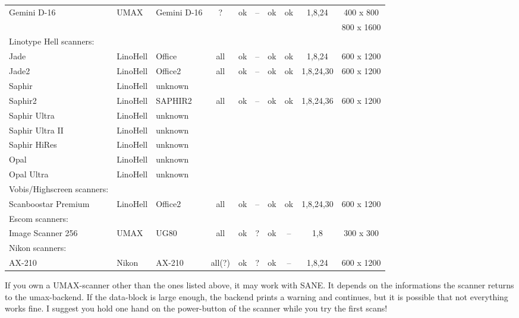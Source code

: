 \begin{tabular}{|l|l|l|c|c|c|c|c|c|c|}
Gemini D-16        &UMAX     &Gemini D-16     &?       &ok  &--  &ok  &ok    &1,8,24    &  400 x 800\\
                   &         &                &        &    &    &    &      &          &  800 x 1600\\
\hline
Linotype Hell scanners:&&&&&&&&&\\
Jade               &LinoHell &Office          &all     &ok  &--  &ok  &ok    &1,8,24    &  600 x 1200\\
Jade2              &LinoHell &Office2         &all     &ok  &--  &ok  &ok    &1,8,24,30 &  600 x 1200\\
Saphir             &LinoHell &unknown         &        &    &    &    &      &          &\\
Saphir2            &LinoHell &SAPHIR2         &all     &ok  &--  &ok  &ok    &1,8,24,36 &  600 x 1200\\
Saphir Ultra       &LinoHell &unknown         &        &    &    &    &      &          &\\
Saphir Ultra II    &LinoHell &unknown         &        &    &    &    &      &          &\\
Saphir HiRes       &LinoHell &unknown         &        &    &    &    &      &          &\\
Opal               &LinoHell &unknown         &        &    &    &    &      &          &\\
Opal Ultra         &LinoHell &unknown         &        &    &    &    &      &          &\\
\hline
Vobis/Highscreen scanners:&&&&&&&&&\\
Scanboostar Premium &LinoHell &Office2         &all     &ok  &--  &ok  &ok    &1,8,24,30 &  600 x 1200\\
\hline
Escom scanners:&&&&&&&&&\\
Image Scanner 256  &UMAX     &UG80            &all     &ok  &?   &ok  &--    &1,8       &  300 x  300\\
\hline
Nikon scanners:&&&&&&&&&\\
AX-210             &Nikon    &AX-210          &all(?)  &ok  &?   &ok  &--    &1,8,24    &   600 x  1200\\
\hline
\end{tabular}
\normalsize


If you own a UMAX-scanner other than the ones listed above, it may work with SANE.
It depends on the informations the scanner returns to the umax-backend. If the
data-block is large enough, the backend prints a warning and continues, but it is
possible that not everything works fine. I suggest you hold one hand on the
power-button of the scanner while you try the first scans!




